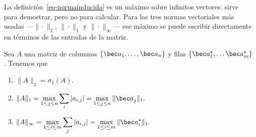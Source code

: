 La definición~\eqref{eq-normainducida} es un máximo sobre infinitos vectores:
sirve para demostrar, pero no para calcular. Para las tres normas vectoriales
más usadas ---$\|\cdot\|_2$, $\|\cdot\|_1$ y $\|\cdot\|_\infty$--- ese máximo
se puede escribir directamente en términos de las entradas de la matriz.

\begin{thm}\label{teo-l1l2linfty} Sea $A$ una matriz de columnas $\{\bec a_1, \dots, \bec a_n\}$ y filas $\{\bec a_1^\star, \dots \bec a_m^\star\}$. Tenemos que 
    \begin{enumerate}[label=\textup{(\alph*)}]
        \item\label{item-l2} $\|A\|_2 = \sigma_1(A)$.
        \item\label{item-l1} \(\displaystyle\|A\|_1  = \max_{1
        \leq j
        \leq n} \sum_i |a_{i,j}| = \max_{1\leq j\leq n} \|\bec a_j\|_1. \)
        \item\label{item-linfty} \(\displaystyle\|A\|_\infty = \max_{1\leq i \leq m} \sum_j |a_{i,j}| =  \max_{1\leq i\leq m} \|\bec a_i^\star\|_1. \) 
    \end{enumerate}
\end{thm}

